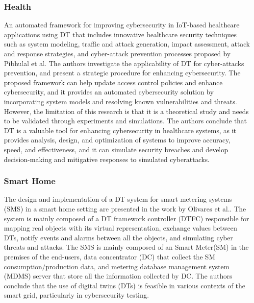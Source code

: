 \subsubsection{Health}
An automated framework for improving cybersecurity in IoT-based healthcare applications using DT that includes innovative healthcare security techniques such as system modeling, traffic and attack generation, impact assessment, attack and response strategies, and cyber-attack prevention processes proposed by Pibhulal et al.\cite{pirbhulalNovelFrameworkReinforcing2022} The authors investigate the applicability of DT for cyber-attacks prevention, and present a strategic procedure for enhancing cybersecurity. The proposed framework can help update access control policies and enhance cybersecurity, and it provides an automated cybersecurity solution by incorporating system models and resolving known vulnerabilities and threats. However, the limitation of this research is that it is a theoretical study and needs to be validated through experiments and simulations. The authors conclude that DT is a valuable tool for enhancing cybersecurity in healthcare systems, as it provides analysis, design, and optimization of systems to improve accuracy, speed, and effectiveness, and it can simulate security breaches and develop decision-making and mitigative responses to simulated cyberattacks. 

\subsubsection{Smart Home}
The design and implementation of a DT system for smart metering systems (SMS) in a smart home setting are presented in the work by Olivares et al.\cite{olivares-rojasCybersecuritySmartGrid2022}. The system is mainly composed of a DT framework controller (DTFC) responsible for mapping real objects with its virtual representation, exchange values between DTs, notify events and alarms between all the objects, and simulating cyber threats and attacks. The SMS is mainly composed of an Smart Meter(SM) in the premises of the end-users, data concentrator (DC) that collect the SM consumption/production data, and metering database management system (MDMS) server that store all the information collected by DC. The authors conclude that the use of digital twins (DTs) is feasible in various contexts of the smart grid, particularly in cybersecurity testing.

